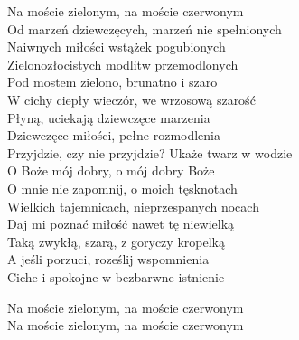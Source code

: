 \begin{text}
    Na moście zielonym, na moście czerwonym\\
    Od marzeń dziewczęcych, marzeń nie spełnionych\\
    Naiwnych miłości wstążek pogubionych\\
    Zielonozłocistych modlitw przemodlonych\\
    Pod mostem zielono, brunatno i szaro\\
    W cichy ciepły wieczór, we wrzosową szarość\\
    Płyną, uciekają dziewczęce marzenia\\
    Dziewczęce miłości, pełne rozmodlenia\\
    Przyjdzie, czy nie przyjdzie? Ukaże twarz w wodzie­\\
    O Boże mój dobry, o mój dobry Boże\\
    O mnie nie zapomnij, o moich tęsknotach\\
    Wielkich tajemnicach, nieprzespanych nocach\\
    Daj mi poznać miłość nawet tę niewielką\\
    Taką zwykłą, szarą, z goryczy kropelką\\
    A jeśli porzuci, roześlij wspomnienia\\
    Ciche i spokojne w bezbarwne istnienie

    Na moście zielonym, na moście czerwonym\\
    Na moście zielonym, na moście czerwonym
\end{text}
\begin{chord}

\end{chord}